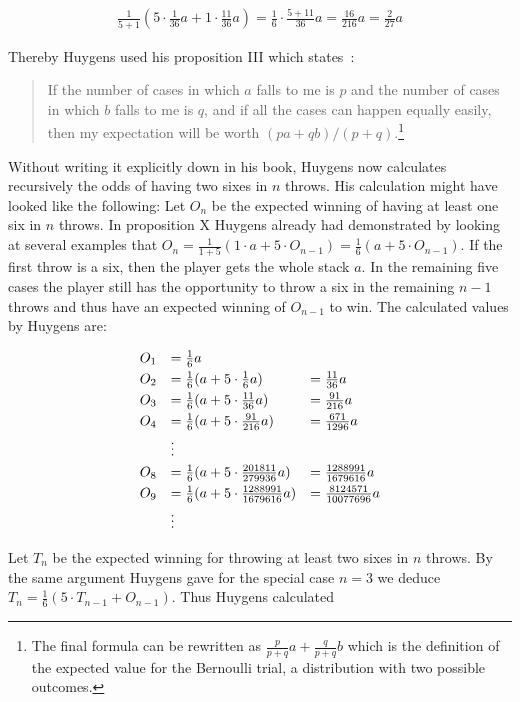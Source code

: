 \begin{align}
  \frac{1}{5+1} \left(5 \cdot \frac 1{36} a + 1 \cdot \frac{11}{36} a \right) = \frac{1}{6} \cdot \frac{5+11}{36} a = \frac{16}{216} a = \frac{2}{27} a
\end{align}

\noindent Thereby Huygens used his proposition III which states~\cite[p. 135]{bernoulli}:

\begin{quotation}
  If the number of cases in which $a$ falls to me is $p$ and the number of cases in which $b$ falls to me is $q$, and if all the cases can happen equally easily, then my expectation will be worth $(pa+qb)/(p+q)$.\footnote{The final formula can be rewritten as $\tfrac{p}{p+q} a+\tfrac q{p+q} b$ which is the definition of the expected value for the Bernoulli trial, a distribution with two possible outcomes. }
\end{quotation}

Without writing it explicitly down in his book, Huygens now calculates recursively the odds of having two sixes in $n$ throws. His calculation might have looked like the following: Let $O_n$ be the expected winning of having at least one six in $n$ throws. In proposition X Huygens already had demonstrated by looking at several examples that $O_n = \tfrac 1{1+5} \left( 1 \cdot a + 5 \cdot O_{n-1} \right)=\tfrac 16 \left( a + 5 \cdot O_{n-1} \right)$. If the first throw is a six, then the player gets the whole stack $a$. In the remaining five cases the player still has the opportunity to throw a six in the remaining $n-1$ throws and thus have an expected winning of $O_{n-1}$ to win. The calculated values by Huygens are:

\begin{align}
  \begin{array}{rll}
    O_1 & = \frac 16 a \nl
    O_2 & = \frac 16 ( a + 5 \cdot \frac 16 a) & = \frac{11}{36} a \nl
    O_3 & = \frac 16 ( a + 5 \cdot \frac{11}{36} a) & = \frac{91}{216} a \nl
    O_4 & = \frac 16 ( a + 5 \cdot \frac{91}{216} a) & = \frac{671}{1296} a \nl
    & \vdots \nl
    O_8 & = \frac 16 ( a + 5 \cdot \frac{201811}{279936} a) & = \frac{1288991}{1679616} a \nl
    O_9 & = \frac 16 ( a + 5 \cdot \frac{1288991}{1679616} a) & = \frac{8124571}{10077696} a \nl
    & \vdots
  \end{array}
\end{align}

Let $T_n$ be the expected winning for throwing at least two sixes in $n$ throws. By the same argument Huygens gave for the special case $n=3$ we deduce $T_n = \tfrac{1}{6} ( 5 \cdot T_{n-1}  + O_{n-1})$. Thus Huygens calculated

